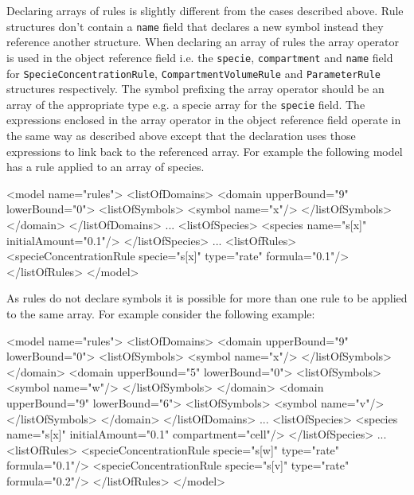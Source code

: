 \documentclass{cekarticle}
\begin{document}
Declaring arrays of rules is slightly different from the cases
described above. Rule structures don't contain a \texttt{name}
field that declares a new symbol instead they reference another
structure.  When declaring an array of rules the array operator
is used in the object reference field i.e. the \texttt{specie},
\texttt{compartment} and \texttt{name} field for
\texttt{SpecieConcentrationRule}, \texttt{CompartmentVolumeRule}
and \texttt{ParameterRule} structures respectively. The symbol
prefixing the array operator should be an array of the appropriate
type e.g. a specie array for the \texttt{specie} field.  The
expressions enclosed in the array operator in the object
reference field operate in the same way as described above except
that the declaration uses those expressions to link back to the
referenced array.  For example the following model has a rule
applied to an array of species.

\begin{example}
<model name="rules">
    <listOfDomains>
        <domain upperBound="9" lowerBound="0">
            <listOfSymbols>
                <symbol name="x"/>
            </listOfSymbols>
        </domain>
    </listOfDomains>
    ...
    <listOfSpecies>
        <species name="s[x]" initialAmount="0.1"/>
    </listOfSpecies>
    ...
    <listOfRules>
        <specieConcentrationRule specie="s[x]" type="rate" formula="0.1"/>
    </listOfRules>
</model>
\end{example}

As rules do not declare symbols it is possible for more than one
rule to be applied to the same array. For example consider the
following example:

\begin{example}
<model name="rules">
    <listOfDomains>
        <domain upperBound="9" lowerBound="0">
            <listOfSymbols>
                <symbol name="x"/>
            </listOfSymbols>
        </domain>
        <domain upperBound="5" lowerBound="0">
            <listOfSymbols>
                <symbol name="w"/>
            </listOfSymbols>
        </domain>
        <domain upperBound="9" lowerBound="6">
            <listOfSymbols>
                <symbol name="v"/>
            </listOfSymbols>
        </domain>
    </listOfDomains>
    ...
    <listOfSpecies>
        <species name="s[x]" initialAmount="0.1" compartment="cell"/>
    </listOfSpecies>
    ...
    <listOfRules>
        <specieConcentrationRule specie="s[w]" type="rate" formula="0.1"/>
        <specieConcentrationRule specie="s[v]" type="rate" formula="0.2"/>
    </listOfRules>
</model>
\end{example}
\end{document}
